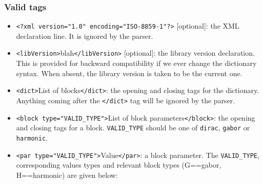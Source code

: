 \documentclass[11pt,a4paper]{article}
\begin{document}
\subsubsection*{Valid tags}
\begin{itemize}

\item \verb+<?xml version="1.0" encoding="ISO-8859-1"?>+ [optional]: the XML
  declaration line. It is ignored by the parser.
  
\item \verb+<libVersion>+blah\verb+</libVersion>+ [optional]: the library
  version declaration. This is provided for backward compatibility if we ever
  change the dictionary syntax. When absent, the library version is taken to be
  the current one.

\item \verb+<dict>+List of blocks\verb+</dict>+: the opening and closing tags
  for the dictionary. Anything coming after the \verb+</dict>+ tag will be
  ignored by the parser.

\item \verb+<block type="VALID_TYPE">+List of block
  parameters\verb+</block>+: the opening and closing tags for a block.
  \verb+VALID_TYPE+ should be one of \verb+dirac+, \verb+gabor+ or
  \verb+harmonic+.
  
\item \verb+<par type="VALID_TYPE">+Value\verb+</par>+: a block parameter. The
  \verb+VALID_TYPE+, corresponding values types and relevant block types
  (G==gabor, H==harmonic) are given below:
\end{itemize}
\end{document}
